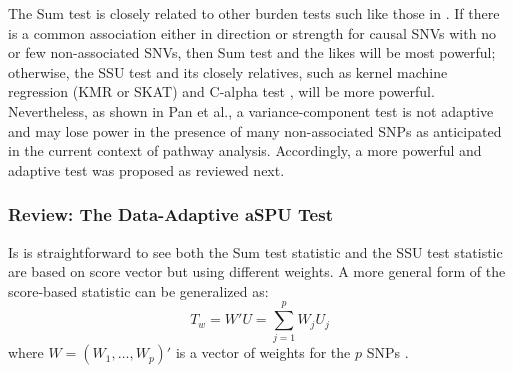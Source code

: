 \documentclass[12pt]{article}
\begin{document}
The Sum test is closely related to other burden tests such like those in \cite{Morgenthaler2007,Li2008,Madsen2009}. If there is a common association either in direction or strength for causal SNVs with no or few non-associated SNVs, then Sum test and the likes will be most powerful; otherwise, the SSU test and its closely relatives, such as kernel machine regression (KMR or SKAT) \cite{Lee2012,Ionita-Laza2013,Oualkacha2013,Lee2012a,Wu2011} and C-alpha test \cite{Neale2011}, will be more powerful. Nevertheless, as shown in Pan et al.,\cite{Pan2015a,pan2014powerful} a variance-component test is not adaptive and may lose power in the presence of many non-associated SNPs as anticipated in
the current context of pathway analysis. Accordingly, a more powerful and adaptive test was proposed as
reviewed next.

\subsubsection{Review: The Data-Adaptive aSPU Test} 
Is is straightforward to see both the Sum test statistic and the SSU test statistic are based on score vector but using different weights. A more general form of the score-based statistic can be generalized as:
$$
T_w = W' U = \sum_{j=1}^p W_j U_j
$$
where $W = (W_1, \ldots, W_p)'$ is a vector of weights for the $p$ SNPs \cite{Lin2011}. 
\end{document}
